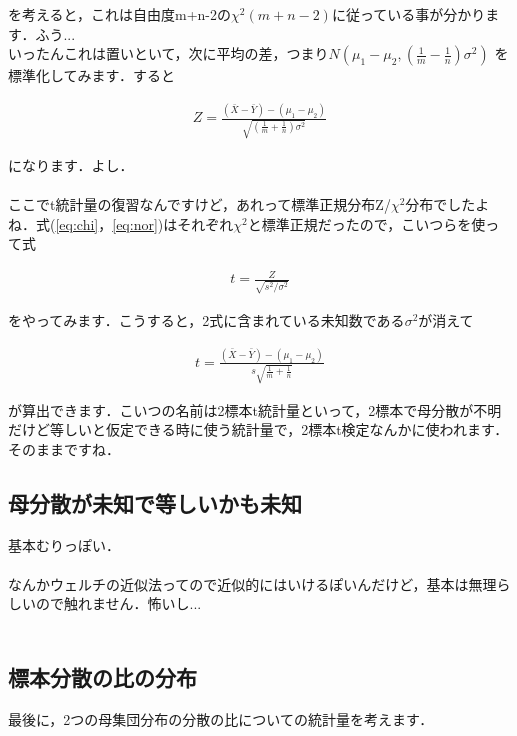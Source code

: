 \documentclass[11pt,a4paper,uplatex]{ujreport} 	%
\begin{document}
を考えると，これは自由度m+n-2の$\chi^2(m+n-2)$に従っている事が分かります．ふう...\\

いったんこれは置いといて，次に平均の差，つまり$N(\mu_1 -\mu_2, (\frac{1}{m} - \frac{1}{n})\sigma^2)$
を標準化してみます．すると

\begin{align}
  Z= \frac{(\bar{X}- \bar{Y}) - (\mu_1 - \mu_2)}{\sqrt{(\frac{1}{m} + \frac{1}{n})\sigma^2}}
  \label{eq:nor}
\end{align}

になります．よし．\\
\\

ここでt統計量の復習なんですけど，あれって標準正規分布Z/$\chi^2$分布でしたよね．式(\ref{eq:chi}，\ref{eq:nor})はそれぞれ$\chi^2$と標準正規だったので，こいつらを使って式

\begin{align}
  t = \frac{Z}{\sqrt{s^2/\sigma^2}}
\end{align}

をやってみます．こうすると，2式に含まれている未知数である$\sigma^2$が消えて

\begin{align}
  t = \frac{(\bar{X}- \bar{Y}) - (\mu_1 - \mu_2)}{s\sqrt{\frac{1}{m} + \frac{1}{n}}}
\end{align}

が算出できます．こいつの名前は2標本t統計量といって，2標本で母分散が不明だけど等しいと仮定できる時に使う統計量で，2標本t検定なんかに使われます．そのままですね．





\subsection{母分散が未知で等しいかも未知}
基本むりっぽい．\\
\\

なんかウェルチの近似法ってので近似的にはいけるぽいんだけど，基本は無理らしいので触れません．怖いし...\\\\

\subsection{標本分散の比の分布}
最後に，2つの母集団分布の分散の比についての統計量を考えます．\\
\end{document}

